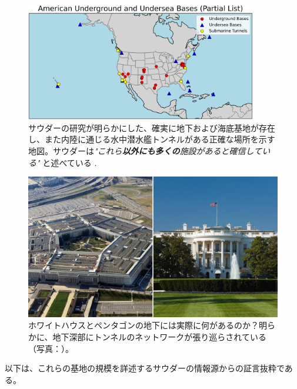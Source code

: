 \documentclass[10pt,twocolumn,letterpaper]{article}
\begin{document}
\begin{figure}[t]
\begin{center}
\includegraphics[width=0.9\textwidth]{basescrop.png}
\end{center}
   \caption{サウダーの研究が明らかにした、確実に地下および海底基地が存在し、また内陸に通じる水中潜水艦トンネルがある正確な場所を示す地図。サウダーは\textit{"これら\textbf{以外にも多くの}施設があると確信している"} と述べている \cite{22}.}
   \label{fig:4}
\end{figure}

\begin{figure}[b]
\begin{center}
   \includegraphics[width=1\linewidth]{penta.jpg}
\end{center}
   \caption{ホワイトハウスとペンタゴンの地下には実際に何があるのか？明らかに、地下深部にトンネルのネットワークが張り巡らされている（写真：\cite{31}）。}
\label{fig:3}
\label{fig:onecol}
\end{figure}

以下は、これらの基地の規模を詳述するサウダーの情報源からの証言抜粋である。
\end{document}
